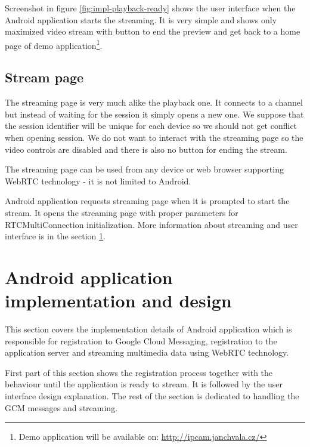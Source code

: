 
Screenshot in figure \ref{fig:impl-playback-ready} shows the user interface when the Android application starts the streaming. It is very simple and shows only maximized video stream with button to end the preview and get back to a home page of demo application\footnote{Demo application will be available on: \url{http://ipcam.janchvala.cz/}}.





\subsection{Stream page}
\label{subsec:streaming-page}
The streaming page is very much alike the playback one. It connects to a channel but instead of waiting for the session it simply opens a new one. We suppose that the session identifier will be unique for each device so we should not get conflict when opening session. We do not want to interact with the streaming page so the video controls are disabled and there is also no button for ending the stream.

The streaming page can be used from any device or web browser supporting WebRTC technology - it is not limited to Android.

Android application requests streaming page when it is prompted to start the stream. It opens the streaming page with proper parameters for RTCMultiConnection initialization. More information about streaming and user interface is in the section \ref{sec:androidImpl}.



\section{Android application implementation and design}
\label{sec:androidImpl}
This section covers the implementation details of Android application which is responsible for registration to Google Cloud Messaging, registration to the application server and streaming multimedia data using WebRTC technology.

First part of this section shows the registration process together with the behaviour until the application is ready to stream. It is followed by the user interface design explanation. The rest of the section is dedicated to handling the GCM messages and streaming.

